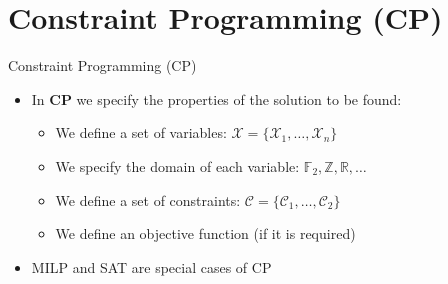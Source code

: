 \documentclass[table,aspectratio=169]{beamer}
\begin{document}
\section{Constraint Programming (CP)}

\begin{frame}{Constraint Programming (CP)}
\begin{itemize}
\item In \textbf{CP} we specify the properties of the solution to be found:
\begin{itemize}
\item<1-> We define a set of variables: $\mathcal{X} = \{\mathcal{X}_{1}, \ldots, \mathcal{X}_{n}\}$
\item<2-> We specify the domain of each variable: $\mathbb{F}_{2}, \mathbb{Z}, \mathbb{R}, \ldots$
\item<3-> We define a set of constraints: $\mathcal{C} = \{\mathcal{C}_{1}, \ldots, \mathcal{C}_{2}\}$
\item<4-> We define an objective function (if it is required)
\end{itemize}
\item<5-> \textcolor{tugred}{MILP} and \textcolor{tugblue}{SAT} are special cases of CP
\end{itemize}
\end{frame}
\end{document}

